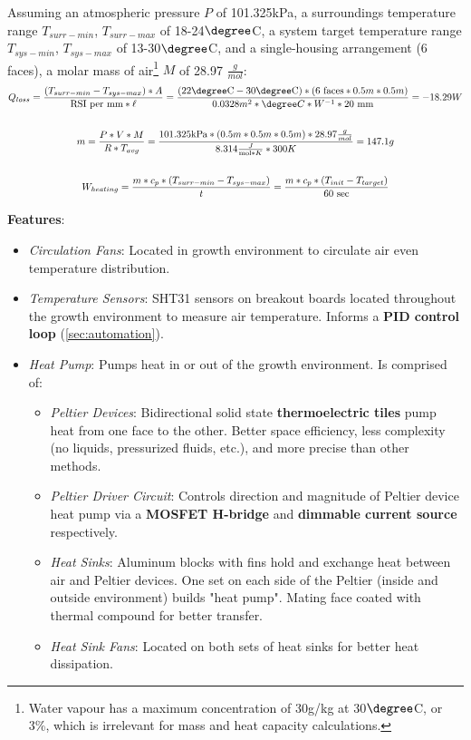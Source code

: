 \documentclass{report}
\begin{document}
Assuming an atmospheric pressure $P$ of 101.325kPa, a surroundings temperature range $T_{surr-min}$, $T_{surr-max}$ of 18-24$\degree$C, a system target temperature range $T_{sys-min}$, $T_{sys-max}$ of 13-30$\degree$C, and a single-housing arrangement (6 faces), a molar mass of air\footnote{Water vapour has a maximum concentration of 30g/kg at 30$\degree$C, or 3\%, which is irrelevant for mass and heat capacity calculations.} $M$ of 28.97 $\frac g{mol}$:\\
\vspace{.05cm}
\begin{gather*}
    \label{eqn:heatloss}
    Q_{loss}=\frac{(T_{surr-min}-T_{sys-max}) * A}{\text{RSI per mm} * \ell}=\frac{(22\degree \text{C}-30\degree \text{C}) * (6 \text{ faces} * 0.5m * 0.5m)}{0.0328 m^2 * \degree C*W^{-1} * 20 \text{ mm}}=-18.29 W\\\vspace{.05cm}\\
    \label{eqn:airmass}
    m=\frac{P*V*M}{R*T_{avg}}=\frac{101.325\text{kPa}*(0.5m*0.5m*0.5m)*28.97\frac g{mol}}{8.314\frac{J}{\text{mol}*K}*300K}=147.1g\\\vspace{.05cm}\\
    \label{eqn:heatcapacity}
    W_{heating}=\frac{m*c_p*(T_{surr-min}-T_{sys-max})}{t}=\frac{m*c_p*(T_{init}-T_{target})}{60\text{ sec}}
\end{gather*}

\newpage

\textbf{Features}:
\begin{itemize}
    \item \textit{Circulation Fans}: Located in growth environment to circulate air even temperature distribution.
    \item \textit{Temperature Sensors}: SHT31 \cite{sht31} sensors on breakout boards located throughout the growth environment to measure air temperature. Informs a \textbf{PID control loop} (\ref{sec:automation}).
    \item \textit{Heat Pump}: Pumps heat in or out of the growth environment. Is comprised of:
    \begin{itemize}
        \item \textit{Peltier Devices}: Bidirectional solid state \textbf{thermoelectric tiles} pump heat from one face to the other. Better space efficiency, less complexity (no liquids, pressurized fluids, etc.), and more precise than other methods.
        \item \textit{Peltier Driver Circuit}: Controls direction and magnitude of Peltier device heat pump via a \textbf{MOSFET H-bridge} and \textbf{dimmable current source} respectively.
        \item \textit{Heat Sinks}: Aluminum blocks with fins hold and exchange heat between air and Peltier devices. One set on each side of the Peltier (inside and outside environment) builds "heat pump". Mating face coated with thermal compound for better transfer.
        \item \textit{Heat Sink Fans}: Located on both sets of heat sinks for better heat dissipation.
    \end{itemize}
\end{itemize}
\end{document}
